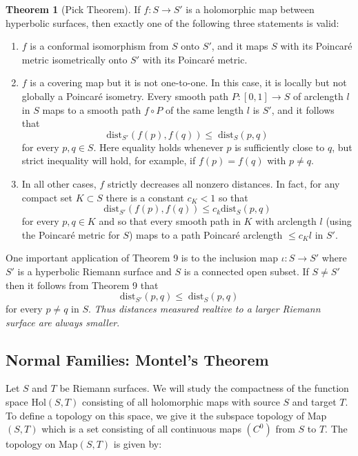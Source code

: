 \documentclass{article}
\theoremstyle{definition}
\newtheorem{theorem}{Theorem}
\begin{document}
    \begin{theorem}[Pick Theorem]
        If $f:S\to S'$ is a holomorphic map between hyperbolic surfaces, then exactly one of the following three statements is valid:
        \begin{enumerate}
            \item $f$ is a conformal isomorphism from $S$ onto $S'$, and it maps $S$ with its Poincaré metric isometrically onto $S'$
                with its Poincaré metric.
            \item $f$ is a covering map but it is not one-to-one. In this case, it is locally but not globally a Poincaré isometry.
                Every smooth path $P:[0,1]\to S$ of arclength $l$ in $S$ maps to a smooth path $f\circ P$ of the same length $l$
                is $S'$, and it follows that
                \[ \text{dist}_{S'}(f(p),f(q)) \leq\;\text{dist}_S(p,q) \]
                for every $p,q\in S$. Here equality holds whenever $p$ is sufficiently close to $q$, but strict inequality will hold,
                for example, if $f(p) = f(q)$ with $p\neq q$.
            \item In all other cases, $f$ strictly decreases all nonzero distances. In fact, for any compact set $K\subset S$ there
                is a constant $c_K < 1$ so that
                \[ \text{dist}_{S'}(f(p),f(q)) \leq c_k\text{dist}_S(p,q) \]
                for every $p,q\in K$ and so that every smooth path in $K$ with arclength $l$ (using the Poincaré metric for $S$) maps
                to a path Poincaré arclength $\leq c_K l$ in $S'$.
        \end{enumerate}
    \end{theorem}

    One important application of Theorem 9 is to the inclusion map $\iota: S\to S'$ where $S'$ is a hyperbolic Riemann surface and
    $S$ is a connected open subset. If $S\neq S'$ then it follows from Theorem 9 that
    \[ \text{dist}_{S'}(p,q) \leq\;\text{dist}_S(p,q) \]
    for every $p\neq q$ in $S$. \textit{Thus distances measured realtive to a larger Riemann surface are always smaller}.

    \newpage

    \subsection{Normal Families: Montel's Theorem}

    Let $S$ and $T$ be Riemann surfaces. We will study the compactness of the function space Hol$(S,T)$ consisting of all holomorphic
    maps with source $S$ and target $T$. To define a topology on this space, we give it the subspace topology of Map$(S,T)$ which
    is a set consisting of all continuous maps $(C^0)$ from $S$ to $T$. The topology on Map$(S,T)$ is given by:
\end{document}
